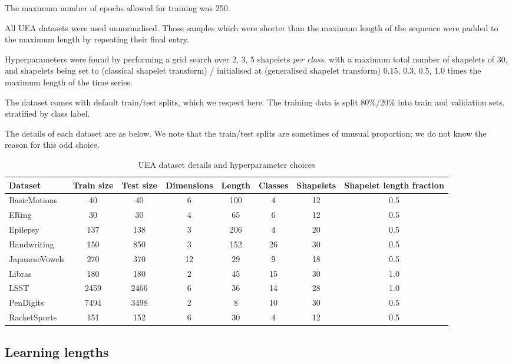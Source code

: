 \documentclass{article}
\theoremstyle{plain}
\theoremstyle{definition}
\begin{document}
	The maximum number of epochs allowed for training was 250.	

	All UEA datasets were used unnormalised. Those samples which were shorter than the maximum length of the sequence were padded to the maximum length by repeating their final entry.
	
	Hyperparameters were found by performing a grid search over 2, 3, 5 shapelets \emph{per class}, with a maximum total number of shapelets of 30, and shapelets being set to (classical shapelet transform) / initialised at (generalised shapelet transform) 0.15, 0.3, 0.5, 1.0 times the maximum length of the time series.
	
	The dataset comes with default train/test splits, which we respect here. The training data is split 80\%/20\% into train and validation sets, stratified by class label.
	
	The details of each dataset are as below. We note that the train/test splits are sometimes of unusual proportion; we do not know the reason for this odd choice.

	\begin{table}[ht]
		\caption{UEA dataset details and hyperparameter choices}
		\label{tab:uea_hyperparams_old}
		\centering
		\begin{tabular}{lccccccc}
			\toprule
			Dataset & Train size & Test size & Dimensions & Length & Classes & \parbox{10mm}{Shapelets} & \parbox{10mm}{Shapelet length fraction} \\ \midrule
			BasicMotions    & 40 & 40 & 6 & 100 & 4 & 12 & 0.5 \\
			ERing           & 30 & 30 & 4 & 65 & 6 & 12 & 0.5 \\
			Epilepsy        & 137 & 138 & 3 & 206 & 4 & 20 & 0.5 \\
			Handwriting     & 150 & 850 & 3 & 152 & 26 & 30 & 0.5 \\
			JapaneseVowels  & 270 & 370 & 12 & 29 & 9 & 18 & 0.5 \\
			Libras          & 180 & 180 & 2 & 45 & 15 & 30 & 1.0 \\
			LSST            & 2459 & 2466 & 6 & 36 & 14 & 28 & 1.0 \\
			PenDigits       & 7494 & 3498 & 2 & 8 & 10 & 30 & 0.5 \\
			RacketSports    & 151 & 152 & 6 & 30 & 4 & 12 & 0.5 \\
			\bottomrule
		\end{tabular}
	\end{table}
	
	\subsection{Learning lengths}
\end{document}
